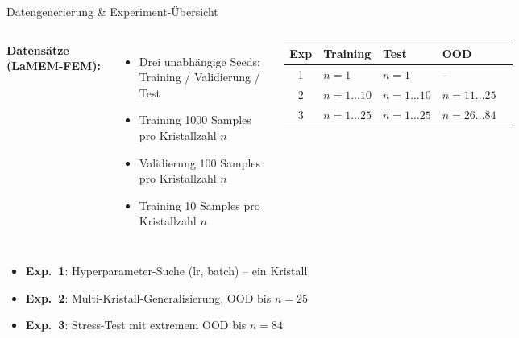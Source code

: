 \documentclass[aspectratio=169]{beamer}
\begin{document}
\begin{frame}{Datengenerierung \& Experiment-Übersicht}
  \begin{columns}[T]
      \textbf{Datensätze (LaMEM-FEM):}
      \begin{itemize}
        \item Drei unabhängige Seeds:\\
              Training / Validierung / Test
        \item Training 1000 Samples pro Kristallzahl $n$
        \item Validierung 100 Samples pro Kristallzahl $n$
        \item Training 10 Samples pro Kristallzahl $n$
      \end{itemize}

      \renewcommand{\arraystretch}{1.45}
      \begin{tabular}{cllll}
        \toprule
        Exp & Training & Test & OOD \\
        \midrule
        1 & $n=1$          & $n=1$          & --             \\
        2 & $n=1\ldots10$  & $n=1\ldots10$  & $n=11\ldots25$ \\
        3 & $n=1\ldots25$  & $n=1\ldots25$  & $n=26\ldots84$ \\
        \bottomrule
      \end{tabular}
  \end{columns}

  \vspace{16pt}
  \begin{itemize}
    \item \textbf{Exp.~1}: Hyperparameter-Suche (lr, batch) -- ein Kristall
    \item \textbf{Exp.~2}: Multi-Kristall-Generalisierung, OOD bis $n=25$
    \item \textbf{Exp.~3}: Stress-Test mit extremem OOD bis $n=84$
  \end{itemize}
\end{frame}
\end{document}
